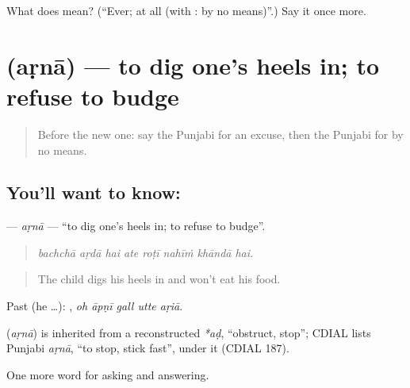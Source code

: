 \begin{tcolorbox}[breakable,colback=teal!4,colframe=teal!35!black,title={Before you move on}]
What does  mean? (\textquotedblleft{}Ever; at all (with : by no means)\textquotedblright{}.) Say it once more.
\end{tcolorbox}
\section[\texorpdfstring{\pa{ਅੜਨਾ} (aṛnā)}{ਅੜਨਾ (aṛnā)}]{ (aṛnā) — to dig one's heels in; to refuse to budge}

\label{lesson:PA-C339-arna}



\begin{quote}
Before the new one: say the Punjabi for an excuse, then the Punjabi for by no means.
\end{quote}

\subsection*{You'll want to know: }
\textbf{} — \emph{aṛnā} — \textquotedblleft{}to dig one's heels in; to refuse to budge\textquotedblright{}.

\begin{quote}
       
\end{quote}

\begin{quote}
\emph{bachchā aṛdā hai ate roṭī nahīṁ khāndā hai.}
\end{quote}

\begin{quote}
The child digs his heels in and won't eat his food.
\end{quote}

Past (he …):     , \emph{oh āpṇī gall utte aṛiā}.

\begin{cousinweb}
\textbf{} (\emph{aṛnā}) is inherited from a reconstructed \emph{*aḍ}, \textquotedblleft{}obstruct, stop\textquotedblright{}; CDIAL lists Punjabi \emph{aṛnā}, \textquotedblleft{}to stop, stick fast\textquotedblright{}, under it (CDIAL 187).
\end{cousinweb}

\begin{grammarlens}[title={What you've built}]
One more word for asking and answering.
\end{grammarlens}

